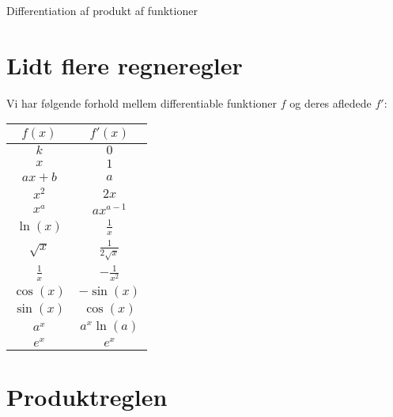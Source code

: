 \begin{center}
\Huge
Differentiation af produkt af funktioner
\end{center}

\section*{Lidt flere regneregler}
\begin{setn}
Vi har følgende forhold mellem differentiable funktioner $f$ og deres afledede $f'$:
\begin{center}
\begin{tabular}{c|c}
$f(x)$ & $f'(x)$\\
\hline
$k$ & $0$\\
$x$  & $1$ \\
$ax+b$ & $a$\\
$x^2$ & $2x$\\
$x^a$ & $ax^{a-1}$\\
$\ln(x)$&$\frac{1}{x}$\\
$\sqrt{x}$ & $\frac{1}{2\sqrt{x}}$\\
$\frac{1}{x}$ & $-\frac{1}{x^2}$\\
$\cos(x)$ & $-\sin(x)$ \\
$\sin(x)$ & $\cos(x)$\\
$a^x$ & $a^x\ln(a)$\\
$e^x$ & $e^x$\\
\end{tabular}
\end{center}
\end{setn}

\section*{Produktreglen}


